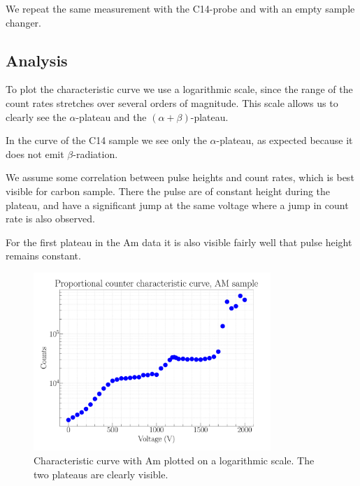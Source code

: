 We repeat the same measurement with the C14-probe and with an empty sample changer.

\subsection{Analysis}

To plot the characteristic curve we use a logarithmic scale, since the range of the count rates stretches over several orders of magnitude. This scale allows us to clearly see the $\alpha$-plateau and the $(\alpha+\beta)$-plateau.

In the curve of the C14 sample we see only the $\alpha$-plateau, as expected because it does not emit $\beta$-radiation.

We assume some correlation between pulse heights and count rates, which is best visible for carbon sample. There the pulse are of constant height during the plateau, and have a significant jump at the same voltage where a jump in count rate is also observed.

For the first plateau in the Am data it is also visible fairly well that pulse height remains constant.

\begin{figure}[H]
\centering
\includegraphics[width=0.8\textwidth]{../Figures/Proportional_characteristic_curve_AM.pdf}
\caption{Characteristic curve with Am plotted on a logarithmic scale. The two plateaus are clearly visible.}
\label{fig:AmChar}
\end{figure}


